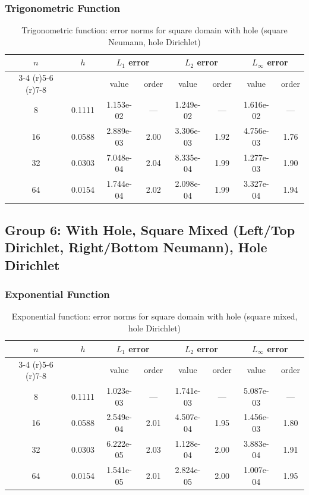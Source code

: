 \documentclass[12pt,a4paper]{article}
\begin{document}
\subsubsection{Trigonometric Function}
\begin{table}[H]
\centering
\caption{Trigonometric function: error norms for square domain with hole (square Neumann, hole Dirichlet)}
\begin{tabular}{cccccccc}
\toprule
$n$ & $h$ & \multicolumn{2}{c}{$L_1$ error} & \multicolumn{2}{c}{$L_2$ error} & \multicolumn{2}{c}{$L_\infty$ error} \\
\cmidrule(r){3-4} \cmidrule(r){5-6} \cmidrule(r){7-8}
& & value & order & value & order & value & order \\
\midrule
8  & 0.1111 & 1.153e-02 & --- & 1.249e-02 & --- & 1.616e-02 & --- \\
16 & 0.0588 & 2.889e-03 & 2.00 & 3.306e-03 & 1.92 & 4.756e-03 & 1.76 \\
32 & 0.0303 & 7.048e-04 & 2.04 & 8.335e-04 & 1.99 & 1.277e-03 & 1.90 \\
64 & 0.0154 & 1.744e-04 & 2.02 & 2.098e-04 & 1.99 & 3.327e-04 & 1.94 \\
\bottomrule
\end{tabular}
\end{table}

\subsection{Group 6: With Hole, Square Mixed (Left/Top Dirichlet, Right/Bottom Neumann), Hole Dirichlet}

\subsubsection{Exponential Function}
\begin{table}[H]
\centering
\caption{Exponential function: error norms for square domain with hole (square mixed, hole Dirichlet)}
\begin{tabular}{cccccccc}
\toprule
$n$ & $h$ & \multicolumn{2}{c}{$L_1$ error} & \multicolumn{2}{c}{$L_2$ error} & \multicolumn{2}{c}{$L_\infty$ error} \\
\cmidrule(r){3-4} \cmidrule(r){5-6} \cmidrule(r){7-8}
& & value & order & value & order & value & order \\
\midrule
8  & 0.1111 & 1.023e-03 & --- & 1.741e-03 & --- & 5.087e-03 & --- \\
16 & 0.0588 & 2.549e-04 & 2.01 & 4.507e-04 & 1.95 & 1.456e-03 & 1.80 \\
32 & 0.0303 & 6.222e-05 & 2.03 & 1.128e-04 & 2.00 & 3.883e-04 & 1.91 \\
64 & 0.0154 & 1.541e-05 & 2.01 & 2.824e-05 & 2.00 & 1.007e-04 & 1.95 \\
\bottomrule
\end{tabular}
\end{table}
\end{document}
